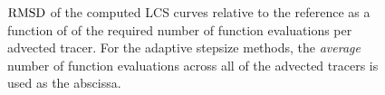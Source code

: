 \begin{figure}[htpb]
    \centering
    
    \caption[$\rmsd$ of the computed LCS curves relative to the reference as a
    function of the required number of function evaluations per advected tracer]
    {$\rmsd$ of the computed LCS curves relative to the reference as a
        function of of the required number of function evaluations per advected
        tracer. For the
        adaptive stepsize methods, the \emph{average} number of function
    evaluations across all of the advected tracers is used as the abscissa.}
    \label{fig:lcs_rmsd_fp_nn_both}
\end{figure}
